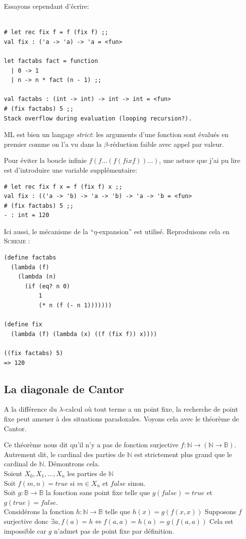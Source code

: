 Essayons cependant d'écrire:

\begin{Verbatim}

# let rec fix f = f (fix f) ;;
val fix : ('a -> 'a) -> 'a = <fun>

let factabs fact = function
  | 0 -> 1
  | n -> n * fact (n - 1) ;;

val factabs : (int -> int) -> int -> int = <fun>
# (fix factabs) 5 ;;
Stack overflow during evaluation (looping recursion?).
\end{Verbatim}
ML est bien un langage \textit{strict}: les arguments d'une fonction sont évalués en premier 
comme on l'a vu dans la $\beta$-réduction faible avec appel par valeur.


Pour éviter la boucle infinie $f(f\ldots(f (fix f))\ldots)$, 
une astuce que j'ai pu lire est d'introduire une variable supplémentaire:

\begin{Verbatim}
# let rec fix f x = f (fix f) x ;;
val fix : (('a -> 'b) -> 'a -> 'b) -> 'a -> 'b = <fun>
# (fix factabs) 5 ;;
- : int = 120
\end{Verbatim}
Ici aussi, le mécanisme de la ``$\eta$-expansion'' est utilisé.
Reproduisons cela en \textsc{Scheme} :
\begin{Verbatim}
(define factabs
  (lambda (f)
    (lambda (n)
      (if (eq? n 0)
          1
          (* n (f (- n 1)))))))

(define fix
  (lambda (f) (lambda (x) ((f (fix f)) x))))

((fix factabs) 5)
=> 120
\end{Verbatim}


\subsection{La diagonale de Cantor} %
 A la différence du $\lambda$-calcul où tout terme a un point fixe, la recherche de point fixe
peut amener à des situations paradoxales.
Voyons cela avec le théorème  de Cantor.


Ce théorème nous dit qu'il n'y a pas de fonction surjective 
$f: \mathbb{N} \rightarrow ( \mathbb{N} \rightarrow \mathbb{B}) $.
Autrement dit, le cardinal des parties de $\mathbb{N}$ est strictement plus grand que le cardinal de $\mathbb{N}$.
Démontrons cela. \\
Soient $X_0, X_1, \ldots, X_n$ les parties de $\mathbb{N}$  \\
Soit $f(m,n) = true$ si $m \in X_n$ et $false$ sinon. \\
Soit $g :\mathbb{B} \rightarrow \mathbb{B}$ la fonction sans point fixe telle que $g(false)=true$ et $g(true)=false$. \\
Considérons la fonction $h: \mathbb{N} \rightarrow \mathbb{B}$ telle que $h(x) = g(f(x,x))$
Supposons $f$ surjective donc $\exists a, f(a)= h \Leftrightarrow  f(a,a) = h(a) = g(f(a,a))$ 
Cela est impossible car $g$ n'admet pas de point fixe par définition.

